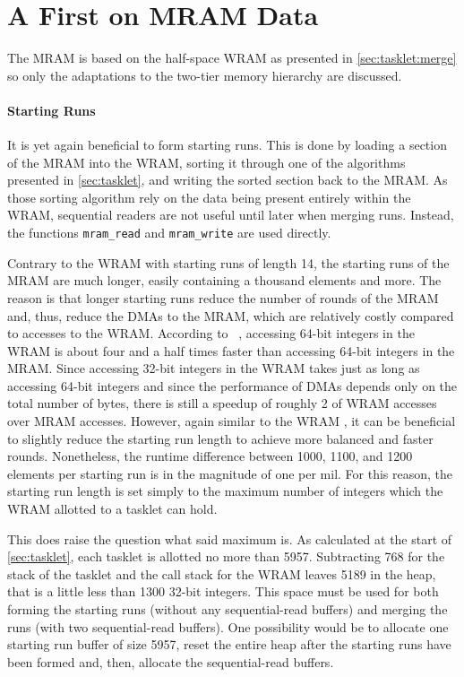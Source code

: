 \section{A First \texorpdfstring{\MS{}}{MergeSort} on MRAM Data}
\label{sec:mram:merge}

The MRAM \MS{} is based on the half-space WRAM \MS{} as presented in \cref{sec:tasklet:merge} so only the adaptations to the two-tier memory hierarchy are discussed.

\paragraph{Starting Runs}
It is yet again beneficial to form starting runs.
This is done by loading a section of the MRAM into the WRAM, sorting it through one of the algorithms presented in \cref{sec:tasklet}, and writing the sorted section back to the MRAM.
As those sorting algorithm rely on the data being present entirely within the WRAM, sequential readers are not useful until later when merging runs.
Instead, the functions \lstinline|mram_read| and \lstinline|mram_write| are used directly.

Contrary to the WRAM \MS{} with starting runs of length 14, the starting runs of the MRAM \MS{} are much longer, easily containing a thousand elements and more.
The reason is that longer starting runs reduce the number of rounds of the MRAM \MS{} and, thus, reduce the DMAs to the MRAM, which are relatively costly compared to accesses to the WRAM.
According to \citeauthor{mutlu2022Benchmarking}~\cite[8\psq]{mutlu2022Benchmarking}, accessing 64-bit integers in the WRAM is about four and a half times faster than accessing 64-bit integers in the MRAM.
Since accessing 32-bit integers in the WRAM takes just as long as accessing 64-bit integers and since the performance of DMAs depends only on the total number of bytes, there is still a speedup of roughly 2 of WRAM accesses over MRAM accesses.
However, again similar to the WRAM \MS{}, it can be beneficial to slightly reduce the starting run length to achieve more balanced and faster rounds.
Nonetheless, the runtime difference between 1000, 1100, and 1200 elements per starting run is in the magnitude of one per mil.
For this reason, the starting run length is set simply to the maximum number of integers which the WRAM allotted to a tasklet can hold.

This does raise the question what said maximum is.
As calculated at the start of \cref{sec:tasklet}, each tasklet is allotted no more than \qty{5957}{\byte}.
Subtracting \qty{768}{\byte} for the stack of the tasklet and the call stack for the WRAM \QS{} leaves \qty{5189}{\byte} in the heap, that is a little less than 1300 32-bit integers.
This space must be used for both forming the starting runs (without any sequential-read buffers) and merging the runs (with two sequential-read buffers).
One possibility would be to allocate one starting run buffer of size \qty{5957}{\byte}, reset the entire heap after the starting runs have been formed and, then, allocate the sequential-read buffers.

